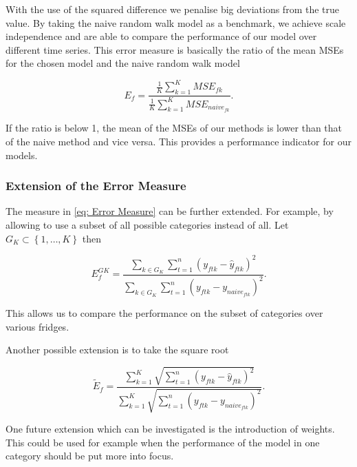 With the use of the squared difference we penalise big deviations from the true value. By taking the naive random walk model as a benchmark, we achieve scale independence and are able to compare the performance of our model over different time series. This error measure is basically the ratio of the mean MSEs for the chosen model and the naive random walk model

\begin{equation}
E_f=\frac{\frac{1}{K}\sum_{k=1}^K MSE_{fk}}{\frac{1}{K}\sum_{k=1}^K MSE_{naive_{fk}}}.
\label{eq: Error Measure MSE}
\end{equation}

If the ratio is below 1, the mean of the MSEs of our methods is lower than that of the naive method and vice versa. This provides a performance indicator for our models. 

\subsubsection{Extension of the Error Measure}
\label{sec:Error Measure Extension}

The measure in \ref{eq: Error Measure} can be further extended. For example, by allowing to use a subset of all possible categories instead of all. Let $G_K \subset \left\{1,\ldots,K\right\}$ then

\begin{equation}
E^{GK}_{f}=\frac{\sum_{k \in G_K}\sum_{t=1}^n(y_{ftk}-\hat{y}_{ftk})^2}{\sum_{k \in G_K}\sum_{t=1}^n(y_{ftk}-y_{naive_{ftk}})^2}.
\label{eq: Error Measure Subsets}
\end{equation}

This allows us to compare the performance on the subset of categories over various fridges. 

Another possible extension is to take the square root

\begin{equation}
\widetilde{E}_f=\frac{\sum_{k=1}^{K}\sqrt{\sum_{t=1}^n(y_{ftk}-\hat{y}_{ftk})^2}}{\sum_{k=1}^{K}\sqrt{\sum_{t=1}^n(y_{ftk}-y_{naive_{ftk}})^2}}.
\label{eq: Error Measure Sqrt} 
\end{equation}

One future extension which can be investigated is the introduction of weights. This could be used for example when the performance of the model in one category should be put more into focus. 